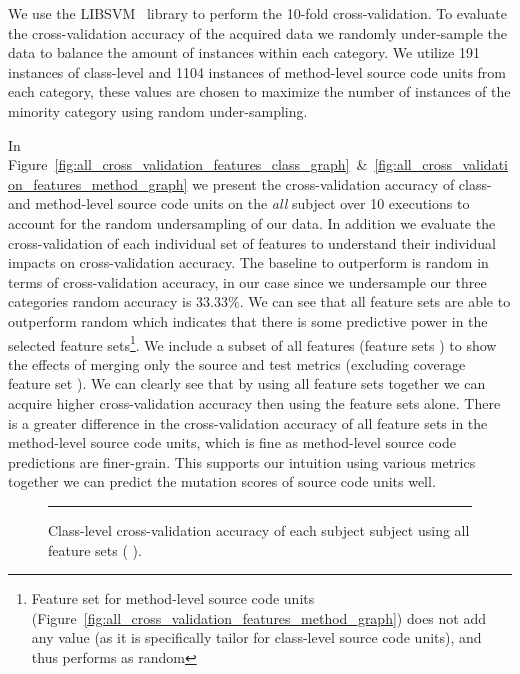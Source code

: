 We use the LIBSVM~\cite{CL11} library to perform the 10-fold cross-validation. To evaluate the cross-validation accuracy of the acquired data we randomly under-sample the data to balance the amount of instances within each category. We utilize 191 instances of class-level and 1104 instances of method-level source code units from each category, these values are chosen to maximize the number of instances of the minority category using random under-sampling.

In Figure~\ref{fig:all_cross_validation_features_class_graph}~\&~\ref{fig:all_cross_validation_features_method_graph} we present the cross-validation accuracy of class- and method-level source code units on the \emph{all} subject over 10 executions to account for the random undersampling of our data. In addition we evaluate the cross-validation of each individual set of features to understand their individual impacts on cross-validation accuracy. The baseline to outperform is random in terms of cross-validation accuracy, in our case since we undersample our three categories random accuracy is 33.33\%. We can see that all feature sets are able to outperform random which indicates that there is some predictive power in the selected feature sets\footnote{Feature set  for method-level source code units (Figure~\ref{fig:all_cross_validation_features_method_graph}) does not add any value (as it is specifically tailor for class-level source code units), and thus performs as random}. We include a subset of all features (feature sets   ) to show the effects of merging only the source and test metrics (excluding coverage feature set ). We can clearly see that by using all feature sets together we can acquire higher cross-validation accuracy then using the feature sets alone. There is a greater difference in the cross-validation accuracy of all feature sets in the method-level source code units, which is fine as method-level source code predictions are finer-grain. This supports our intuition using various metrics together we can predict the mutation scores of source code units well.

\begin{figure}[ht!]
  \centering
  \begin{adjustbox}{max size={.95\textwidth}{.95\textheight}}
    
  \end{adjustbox}
  \caption{Class-level cross-validation accuracy of each subject subject using all feature sets (   ).}
  \vspace{1mm}
  \footnotesize{\emph{}}
  \vspace{2mm}
  \hrule
  \label{fig:individual_cross_validation_class_1_2_3_4_graph}
\end{figure}

